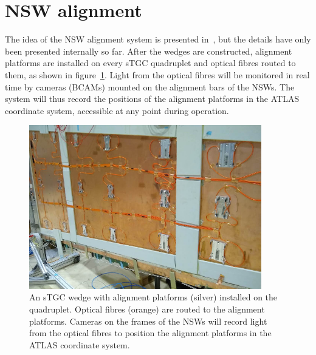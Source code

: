 \section{NSW alignment}
\label{sec:nsw_alignment}

The idea of the NSW alignment system is presented in~\cite{nsw_tdr}, but the details have only been presented internally so far. After the wedges are constructed, alignment platforms are installed on every sTGC quadruplet and optical fibres routed to them, as shown in figure~\ref{fig:alignment_platforms}. Light from the optical fibres will be monitored in real time by cameras (BCAMs) mounted on the alignment bars of the NSWs. The system will thus record the positions of the alignment platforms in the ATLAS coordinate system, accessible at any point during operation. %

\begin{figure}
    \centering
    \includegraphics[width = 0.9\textwidth]{figures/alignment_platforms_lefebvre.png}
    \caption{An sTGC wedge with alignment platforms (silver) installed on the quadruplet. Optical fibres (orange) are routed to the alignment platforms. Cameras on the frames of the NSWs will record light from the optical fibres to position the alignment platforms in the ATLAS coordinate system.}
    \label{fig:alignment_platforms}
\end{figure}

